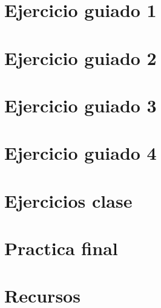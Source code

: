 \documentclass[12pt, twoside, openright]{report} %
\begin{document}
\part{Ejercicio guiado 1}





\part{Ejercicio guiado 2}



\part{Ejercicio guiado 3}







\part{Ejercicio guiado 4}


\part{Ejercicios clase}







\part{Practica final}



\part{Recursos}

\end{document}
